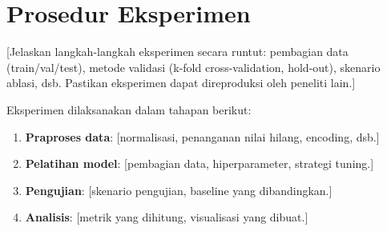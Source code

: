 \section{Prosedur Eksperimen}
\label{sec:3.5}

[Jelaskan langkah-langkah eksperimen secara runtut: pembagian data (train/val/test),
metode validasi (k-fold cross-validation, hold-out), skenario ablasi, dsb. Pastikan
eksperimen dapat direproduksi oleh peneliti lain.]

Eksperimen dilaksanakan dalam tahapan berikut:

\begin{enumerate}
  \item \textbf{Praproses data}: [normalisasi, penanganan nilai hilang, encoding, dsb.]
  \item \textbf{Pelatihan model}: [pembagian data, hiperparameter, strategi tuning.]
  \item \textbf{Pengujian}: [skenario pengujian, baseline yang dibandingkan.]
  \item \textbf{Analisis}: [metrik yang dihitung, visualisasi yang dibuat.]
\end{enumerate}
